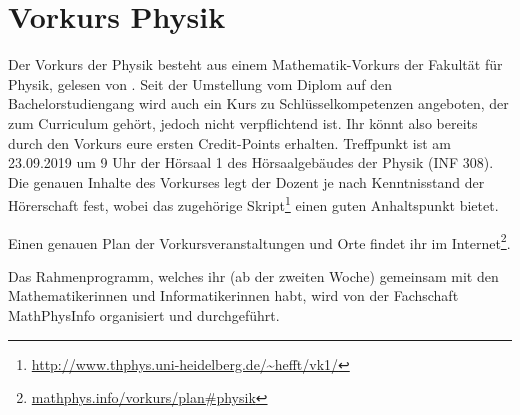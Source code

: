\section{Vorkurs Physik}
Der Vorkurs der Physik besteht aus einem Mathematik-Vorkurs der Fakultät für Physik, gelesen von \dozentvorkurs. Seit der Umstellung vom Diplom auf den Bachelorstudiengang wird auch ein Kurs zu Schlüsselkompetenzen angeboten, der zum Curriculum gehört, jedoch nicht verpflichtend ist. Ihr könnt also bereits durch den Vorkurs eure ersten Credit-Points erhalten. Treffpunkt ist am 23.09.2019 um 9 Uhr der Hörsaal 1 des Hörsaalgebäudes der Physik (\gls{INF} 308). Die genauen Inhalte des Vorkurses legt der Dozent je nach Kenntnisstand der Hörerschaft fest, wobei das zugehörige Skript\footnote{\url{http://www.thphys.uni-heidelberg.de/~hefft/vk1/}} einen guten Anhaltspunkt bietet.

Einen genauen Plan der Vorkursveranstaltungen und Orte findet ihr im Internet\footnote{\url{mathphys.info/vorkurs/plan\#physik}}.

Das Rahmenprogramm, welches ihr (ab der zweiten Woche) gemeinsam mit den Mathematikerinnen und Informatikerinnen habt, wird von der Fachschaft MathPhysInfo organisiert und durchgeführt.

